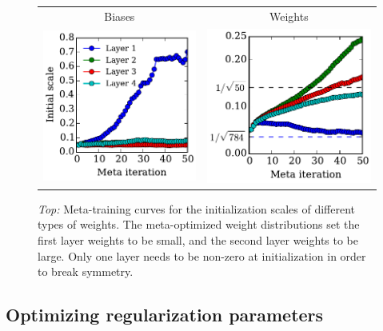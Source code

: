 \documentclass{article}
\begin{document}
\begin{figure}[h!]
\vskip 0.2in
\begin{center}
\begin{tabular}{cc}
 Biases & Weights \\
\hspace{-1em}\includegraphics[width=0.5\columnwidth, height=0.5\columnwidth]{../experiments/Feb_3_training_schedules/3_adam_50/init_bias_learning_curve.pdf} &
\hspace{-1em}\includegraphics[width=0.5\columnwidth, height=0.5\columnwidth]{../experiments/Feb_3_training_schedules/3_adam_50/init_weight_learning_curve.pdf}
\end{tabular}
\caption{\emph{Top:} Meta-training curves for the initialization scales of different types of weights.
The meta-optimized weight distributions set the first layer weights to be small, and the second layer weights to be large.
Only one layer needs to be non-zero at initialization in order to break symmetry.}
\label{fig:nn weight init scales}
\end{center}
\vskip -0.2in
\end{figure} 

\subsection{Optimizing regularization parameters}
\end{document}
